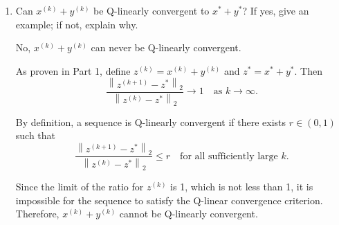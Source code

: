 \documentclass[12pt]{article}
\begin{document}
\begin{enumerate}
\begin{proof}
\begin{adjustwidth}{2em}{}
\noindent Now, as we have shown, as $k \rightarrow \infty$,

\[ \frac{x^{(k + 1)} - x^*}{x^{(k)} - x^*} \rightarrow 1, \quad \frac{y^{(k + 1)} - y^*}{x^{(k)} - x^*} \rightarrow 0, \quad \frac{y^{(k)} - y^*}{x^{(k)} - x^*} \rightarrow 0,\]

\noindent Thus, as $k \rightarrow \infty$,
\[ \frac{\left\|z^{(k + 1)} - z^*\right\|_2}{\left\|z^{(k)} - z^*\right\|_2} = \frac{\left|\frac{x^{(k + 1)} - x^*}{x^{(k)} - x^*} + \frac{y^{(k + 1)} - y^*}{x^{(k)} - x^*}\right|}{\left| 1 + \frac{y^{(k)} - y^*}{x^{(k)} - x^*}\right|} \rightarrow 1\]

\noindent So, $z^{(k)}$ is Q-sublinearly convergent. Since $z^{(k)}$ was defined as $z^{(k)} = x^{(k)} + y^{(k)}$ with $x^{(k)}$ Q-sublinear convergent and $y^{(k)}$ Q-linear convergent, we have proven our claim.


\end{adjustwidth}

\end{proof}


\newpage


\item Can $x^{(k)} + y^{(k)}$ be Q-linearly convergent to $x^*+y^*$? If yes, give an example; if not, explain why.
\vspace{8mm}

No, $x^{(k)} + y^{(k)}$ can never be Q-linearly convergent.

\vspace{4mm}


As proven in Part 1, define $z^{(k)} = x^{(k)} + y^{(k)}$ and $z^* = x^* + y^*$. Then
\[
\frac{\left\|z^{(k+1)} - z^*\right\|_2}{\left\|z^{(k)} - z^*\right\|_2} \rightarrow 1 \quad \text{as } k \rightarrow \infty.
\]

By definition, a sequence is Q-linearly convergent if there exists $r \in (0,1)$ such that
\[
\frac{\left\|z^{(k+1)} - z^*\right\|_2}{\left\|z^{(k)} - z^*\right\|_2} \leq r \quad \text{for all sufficiently large } k.
\]

Since the limit of the ratio for $z^{(k)}$ is 1, which is not less than 1, it is impossible for the sequence to satisfy the Q-linear convergence criterion. Therefore, $x^{(k)} + y^{(k)}$ cannot be Q-linearly convergent. 

\vspace{2mm}

\end{enumerate}
\end{document}
